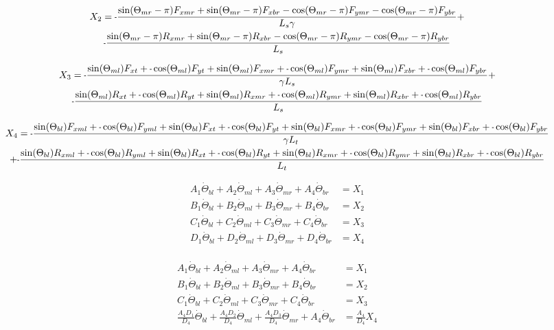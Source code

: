 \documentclass[11pt, landscape]{article}
\newcommand{\mn}{\scalebox{0.7}[1.0]{-}}
\begin{document}
\begin{multline}
  X_2 = \mn\frac{\sin(\Theta_{mr}-\pi)F_{xmr} + \sin(\Theta_{mr}-\pi)F_{xbr} - \cos(\Theta_{mr}-\pi)F_{ymr} - \cos(\Theta_{mr}-\pi)F_{ybr}}{L_{s}\gamma} + \\
  \mn\frac{\sin(\Theta_{mr}-\pi)R_{xmr} + \sin(\Theta_{mr}-\pi)R_{xbr} - \cos(\Theta_{mr}-\pi)R_{ymr} - \cos(\Theta_{mr}-\pi)R_{ybr}}{L_{s}}
\end{multline}

\begin{multline}
  X_3 = \mn \frac{\sin(\Theta_{ml})F_{xt } + \mn \cos(\Theta_{ml})F_{yt } + \sin(\Theta_{ml})F_{xmr} + \mn \cos(\Theta_{ml})F_{ymr} + \sin(\Theta_{ml})F_{xbr} + \mn \cos(\Theta_{ml})F_{ybr}}{\gamma L_s} + \\
	\mn \frac{\sin(\Theta_{ml})R_{xt } + \mn \cos(\Theta_{ml})R_{yt } + \sin(\Theta_{ml})R_{xmr} + \mn \cos(\Theta_{ml})R_{ymr} + \sin(\Theta_{ml})R_{xbr} + \mn \cos(\Theta_{ml})R_{ybr}}{L_s}
\end{multline}

\begin{multline}
  X_4 = \mn \frac{\sin(\Theta_{bl})F_{xml} + \mn\cos(\Theta_{bl})F_{yml} + \sin(\Theta_{bl})F_{xt } + \mn \cos(\Theta_{bl})F_{yt } + \sin(\Theta_{bl})F_{xmr} + \mn \cos(\Theta_{bl})F_{ymr} + \sin(\Theta_{bl})F_{xbr} + \mn \cos(\Theta_{bl})F_{ybr}}
  {\gamma L_t} \\+ \mn \frac{\sin(\Theta_{bl})R_{xml} +\mn \cos(\Theta_{bl})R_{yml} + \sin(\Theta_{bl})R_{xt } + \mn \cos(\Theta_{bl})R_{yt} + \sin(\Theta_{bl})R_{xmr} + \mn \cos(\Theta_{bl})R_{ymr} + \sin(\Theta_{bl})R_{xbr} + \mn \cos(\Theta_{bl})R_{ybr}}{L_t} \\
\end{multline}


\begin{align}
  A_1\dot{\Theta}_{bl} + A_2 \dot{\Theta}_{ml} + A_3 \dot{\Theta}_{mr} + A_4 \dot{\Theta}_{br} &= X_1 \\
  B_1\dot{\Theta}_{bl} + B_2 \dot{\Theta}_{ml} + B_3 \dot{\Theta}_{mr} + B_4 \dot{\Theta}_{br} &= X_2 \\
  C_1\dot{\Theta}_{bl} + C_2 \dot{\Theta}_{ml} + C_3 \dot{\Theta}_{mr} + C_4 \dot{\Theta}_{br} &= X_3 \\
  D_1\dot{\Theta}_{bl} + D_2 \dot{\Theta}_{ml} + D_3 \dot{\Theta}_{mr} + D_4 \dot{\Theta}_{br} &= X_4 \\
\end{align}

\begin{align}
  A_1\dot{\Theta}_{bl} + A_2 \dot{\Theta}_{ml} + A_3 \dot{\Theta}_{mr} + A_4 \dot{\Theta}_{br} &= X_1 \\
  B_1\dot{\Theta}_{bl} + B_2 \dot{\Theta}_{ml} + B_3 \dot{\Theta}_{mr} + B_4 \dot{\Theta}_{br} &= X_2 \\
  C_1\dot{\Theta}_{bl} + C_2 \dot{\Theta}_{ml} + C_3 \dot{\Theta}_{mr} + C_4 \dot{\Theta}_{br} &= X_3 \\
  \frac{A_4D_1}{D_4}\dot{\Theta}_{bl} + \frac{A_4D_2}{D_4}\dot{\Theta}_{ml} + \frac{A_4D_3}{D_4}\dot{\Theta}_{mr} + A_4 \dot{\Theta}_{br} &= \frac{A_4}{D_4}X_4 \\
\end{align}
\end{document}
